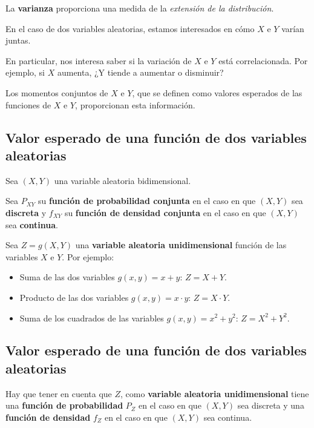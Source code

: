 \documentclass[]{book}
\providecommand{\tightlist}{%
  \setlength{\itemsep}{0pt}\setlength{\parskip}{0pt}}
\begin{document}
La \textbf{varianza} proporciona una medida de la \emph{extensión de la distribución}.

En el caso de dos variables aleatorias, estamos interesados en cómo \(X\) e \(Y\) varían juntas.

En particular, nos interesa saber si la variación de \(X\) e \(Y\) está correlacionada. Por ejemplo, si \(X\) aumenta, ¿Y tiende a aumentar o disminuir?

Los momentos conjuntos de \(X\) e \(Y\), que se definen como valores esperados de las funciones de \(X\) e \(Y\), proporcionan esta información.

\hypertarget{valor-esperado-de-una-funciuxf3n-de-dos-variables-aleatorias}{%
\subsection{Valor esperado de una función de dos variables aleatorias}\label{valor-esperado-de-una-funciuxf3n-de-dos-variables-aleatorias}}

Sea \((X,Y)\) una variable aleatoria bidimensional.

Sea \(P_{XY}\) su \textbf{función de probabilidad conjunta} en el caso en que \((X,Y)\) sea \textbf{discreta} y \(f_{XY}\) su \textbf{función de densidad conjunta} en el caso en que \((X,Y)\) sea \textbf{continua}.

Sea \(Z=g(X,Y)\) una \textbf{variable aleatoria unidimensional} función de las variables \(X\) e \(Y\). Por ejemplo:

\begin{itemize}
\tightlist
\item
  Suma de las dos variables \(g(x,y)=x+y\): \(Z=X+Y\).
\item
  Producto de las dos variables \(g(x,y)=x\cdot y\): \(Z=X\cdot Y\).
\item
  Suma de los cuadrados de las variables \(g(x,y)=x^2+y^2\): \(Z=X^2+Y^2\).
\end{itemize}

\hypertarget{valor-esperado-de-una-funciuxf3n-de-dos-variables-aleatorias-1}{%
\subsection{Valor esperado de una función de dos variables aleatorias}\label{valor-esperado-de-una-funciuxf3n-de-dos-variables-aleatorias-1}}

Hay que tener en cuenta que \(Z\), como \textbf{variable aleatoria unidimensional} tiene una \textbf{función de probabilidad} \(P_Z\) en el caso en que \((X,Y)\) sea discreta y una \textbf{función de densidad} \(f_Z\) en el caso en que \((X,Y)\) sea continua.
\end{document}
